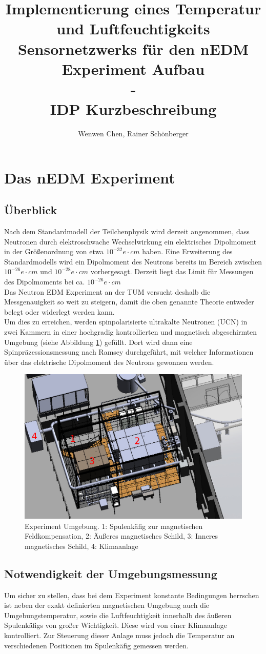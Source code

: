\documentclass[a4paper]{article} %
\title{Implementierung eines Temperatur und Luftfeuchtigkeits Sensornetzwerks für den nEDM Experiment Aufbau\\-\\IDP Kurzbeschreibung}
\author{Wenwen Chen, Rainer Schönberger}
\begin{document}
\maketitle
\section*{Das nEDM Experiment}
\subsection*{Überblick}
Nach dem Standardmodell der Teilchenphysik wird derzeit angenommen, dass
Neutronen durch elektroschwache Wechselwirkung ein elektrisches Dipolmoment
in der Größenordnung von etwa $10^{-32}e\cdot cm$ haben. Eine Erweiterung des
Standardmodells wird ein Dipolmoment des Neutrons bereits im Bereich zwischen
$10^{-26}e\cdot cm$ und $10^{-28}e\cdot cm$ vorhergesagt. Derzeit liegt das
Limit für Messungen des Dipolmoments bei ca. $10^{-26}e\cdot cm$\\
Das Neutron EDM Experiment an der TUM versucht deshalb die Messgenauigkeit so
weit zu steigern, damit die oben genannte Theorie entweder belegt oder
widerlegt werden kann.\\
Um dies zu erreichen, werden spinpolarisierte ultrakalte Neutronen (UCN) in
zwei Kammern in einer hochgradig kontrollierten und magnetisch abgeschirmten
Umgebung (siehe Abbildung \ref{fig:exp}) gefüllt. Dort wird dann eine
Spin\-präzessions\-messung nach Ramsey
durchgeführt, mit welcher Informationen über das elektrische Dipolmoment des
Neutrons gewonnen werden.
\begin{figure}[h]
\centering
\includegraphics[width=0.7\linewidth]{img/frm3d.png}
\caption{Experiment Umgebung. 1: Spulenkäfig zur magnetischen Feldkompensation,
2: Äußeres magnetisches Schild, 3: Inneres magnetisches Schild, 4: Klimaanlage}
\label{fig:exp}
\end{figure}
\subsection*{Notwendigkeit der Umgebungsmessung}
Um sicher zu stellen, dass bei dem Experiment konstante Bedingungen herrschen
ist neben der exakt definierten magnetischen Umgebung auch die 
Umgebungstemperatur, sowie die Luftfeuchtigkeit innerhalb des äußeren
Spulenkäfigs von großer Wichtigkeit. Diese wird von einer Klimaanlage
kontrolliert. Zur Steuer\-ung dieser Anlage muss jedoch die Tempera\-tur an
verschiedenen Positionen im Spulenkäfig gemessen werden.
\end{document}
